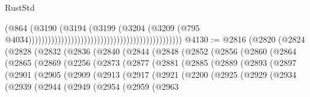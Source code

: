 \begin{lexlean}{RustStd}
\begin{coremodule}
{\begin{coremodule}
{{{{{{{{{{{{{{{{{{{{{{{{{{{{{{{{{{{{{{{{{{{{{{{{{{{{{{{                                                                                    (@864
                                                                                      (@3190
                                                                                        (@3194
                                                                                          (@3199
                                                                                            (@3204
                                                                                              (@3209
                                                                                                (@795
                                                                                                  @4034)))))))))))))))))))))))))))))))))))))))))))))))
@4130 := @2816
    (@2820
      (@2824
        (@2828
          (@2832
            (@2836
              (@2840
                (@2844
                  (@2848
                    (@2852
                      (@2856
                        (@2860
                          (@2864
                            (@2865
                              (@2869
                                (@2256
                                  (@2873
                                    (@2877
                                      (@2881
                                        (@2885
                                          (@2889
                                            (@2893
                                              (@2897
                                                (@2901
                                                  (@2905
                                                    (@2909
                                                      (@2913
                                                        (@2917
                                                          (@2921
                                                            (@2200
                                                              (@2925
                                                                (@2929
                                                                  (@2934
                                                                    (@2939
                                                                      (@2944
                                                                        (@2949
                                                                          (@2954
                                                                            (@2959
                                                                              (@2963
}}}}}}}}}}}}}}}}}}}}}}}}}}}}}}}}}}}}}}}}}}}}}}}}}}}}}}}
\end{coremodule}}
\end{coremodule}
\end{lexlean}
